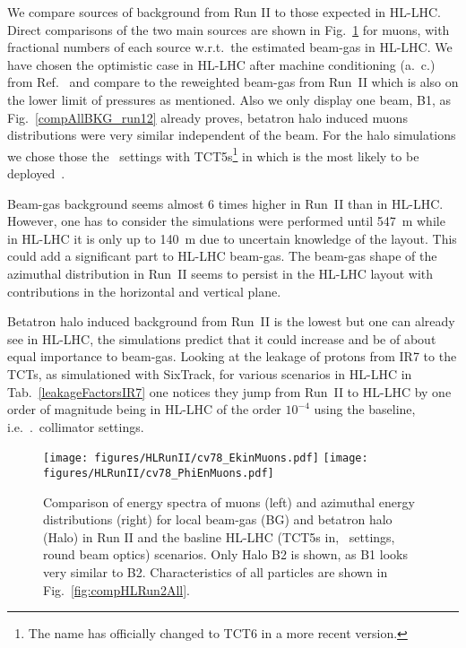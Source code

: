 We compare sources of background from Run II to those expected in HL-LHC. Direct comparisons of the two main sources are shown in Fig.~\ref{fig:HLR2Muons} for muons, with fractional numbers of each source w.r.t.~the estimated beam-gas in HL-LHC. We have chosen the optimistic case in HL-LHC after machine conditioning (a.~c.) from Ref.~\cite{ipac2015_rkh} and compare to the reweighted beam-gas from Run~II which is also on the lower limit of pressures as mentioned. Also we only display one beam, B1, as Fig.~\ref{compAllBKG_run12} already proves, betatron halo induced muons distributions were very similar independent of the beam. For the halo simulations we chose those the \twosigmaret~settings with TCT5s\footnote{The name has officially changed to TCT6 in a more recent version.} in which is the most likely to be deployed~\cite{layoutProcRod}.

Beam-gas background seems almost 6 times higher in Run~II than in HL-LHC. However, one has to consider the simulations were performed until 547~m while in HL-LHC it is only up to 140~m due to uncertain knowledge of the layout. This could add a significant part to HL-LHC beam-gas. The beam-gas shape of the azimuthal distribution in Run~II seems to persist in the HL-LHC layout with contributions in the horizontal and vertical plane.


Betatron halo induced background from Run~II is the lowest but one can already see in HL-LHC, the simulations predict that it could increase and be of about equal importance to beam-gas. Looking at the leakage of protons from IR7 to the TCTs, as simulationed with SixTrack, for various scenarios in HL-LHC in Tab.~\ref{leakageFactorsIR7} one notices they jump from Run~II to HL-LHC by one order of magnitude being in HL-LHC of the order $10^{-4}$ using the baseline, i.e.~\twosigmaret.~collimator settings. 

\begin{figure}
\begin{center}
  \texttt{[image: figures/HLRunII/cv78\_EkinMuons.pdf]}
  \texttt{[image: figures/HLRunII/cv78\_PhiEnMuons.pdf]}
\end{center}
\vspace{-0.6cm}
 \caption{Comparison of energy spectra of muons (left) and azimuthal energy distributions (right) for local beam-gas (BG) and betatron halo (Halo) in Run II and the basline HL-LHC (TCT5s in, \twosigmaret~settings, round beam optics) scenarios. Only Halo B2 is shown, as B1 looks very similar to B2. Characteristics of all particles are shown in Fig.~\ref{fig:compHLRun2All}.
  \label{fig:HLR2Muons}}
\end{figure}
